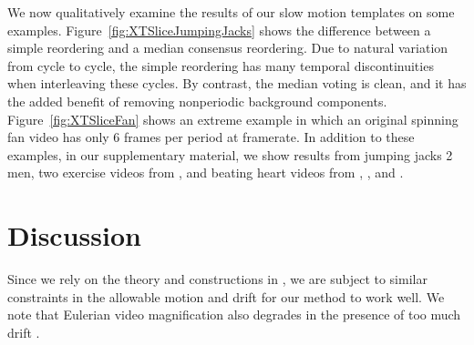 \documentclass{article}
\begin{document}
We now qualitatively examine the results of our slow motion templates on some examples.  Figure~\ref{fig:XTSliceJumpingJacks} shows the difference between a simple reordering and a median consensus reordering.  Due to natural variation from cycle to cycle, the simple reordering has many temporal discontinuities when interleaving these cycles.  By contrast, the median voting is clean, and it has the added benefit of removing nonperiodic background components.  Figure~\ref{fig:XTSliceFan} shows an extreme example in which an original spinning fan video has only 6 frames per period at framerate.  In addition to these examples, in our supplementary material, we show results from jumping jacks 2 men, two exercise videos from \cite{levy2015live}, and beating heart videos from \cite{traliehigh}, \cite{wu2012eulerian}, and \cite{wadhwa2013phase}.

\section{Discussion}

Since we rely on the theory and constructions in \cite{tralie2017quasi}, we are subject to similar constraints in the allowable motion and drift for our method to work well.  We note that Eulerian video magnification also degrades in the presence of too much drift \cite{wu2012eulerian, wadhwa2013phase}.




\end{document}
